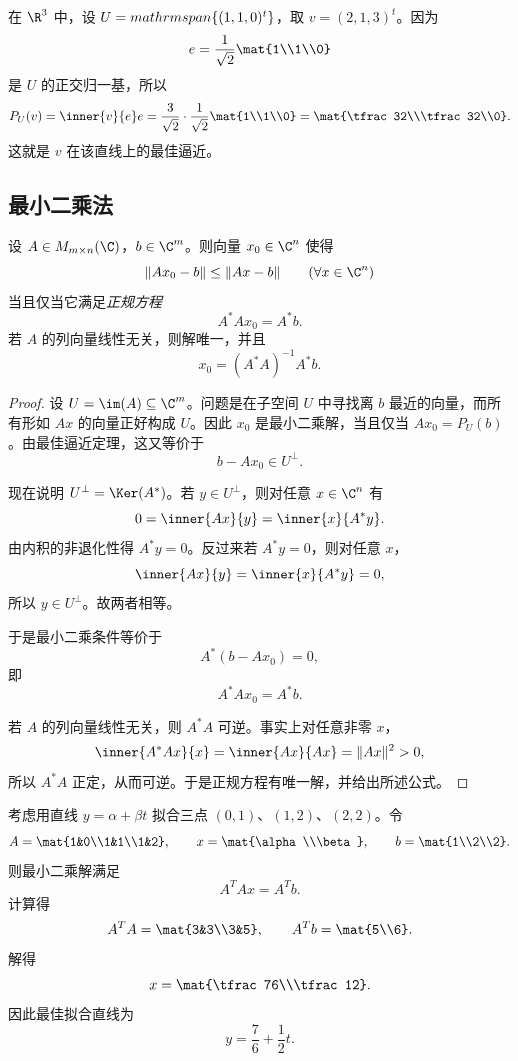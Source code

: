 \begin{example}
在 $\R^3$ 中，设 $U=\\mathrm{span}\{(1,1,0)^t\}$，取 $v=(2,1,3)^t$。因为
\[
e=\frac{1}{\sqrt2}\mat{1\\1\\0}
\]
是 $U$ 的正交归一基，所以
\[
P_U(v)=\inner{v}{e}e=\frac{3}{\sqrt2}\cdot \frac{1}{\sqrt2}\mat{1\\1\\0}=\mat{\tfrac32\\\tfrac32\\0}.
\]
这就是 $v$ 在该直线上的最佳逼近。
\end{example}

\subsection{最小二乘法}

\begin{theorem}[最小二乘与正规方程]
设 $A\in M_{m\times n}(\C)$，$b\in\C^m$。则向量 $x_0\in\C^n$ 使得
\[
\|Ax_0-b\|\le \|Ax-b\|\qquad (\forall x\in\C^n)
\]
当且仅当它满足\emph{正规方程}
\[
A^*Ax_0=A^*b.
\]
若 $A$ 的列向量线性无关，则解唯一，并且
\[
x_0=(A^*A)^{-1}A^*b.
\]
\end{theorem}

\begin{proof}
设 $U=\im(A)\subseteq \C^m$。问题是在子空间 $U$ 中寻找离 $b$ 最近的向量，而所有形如 $Ax$ 的向量正好构成 $U$。因此 $x_0$ 是最小二乘解，当且仅当 $Ax_0=P_U(b)$。由最佳逼近定理，这又等价于
\[
b-Ax_0\in U^{\perp}.
\]

现在说明 $U^{\perp}=\Ker(A^*)$。若 $y\in U^{\perp}$，则对任意 $x\in\C^n$ 有
\[
0=\inner{Ax}{y}=\inner{x}{A^*y}.
\]
由内积的非退化性得 $A^*y=0$。反过来若 $A^*y=0$，则对任意 $x$，
\[
\inner{Ax}{y}=\inner{x}{A^*y}=0,
\]
所以 $y\in U^{\perp}$。故两者相等。

于是最小二乘条件等价于
\[
A^*(b-Ax_0)=0,
\]
即
\[
A^*Ax_0=A^*b.
\]

若 $A$ 的列向量线性无关，则 $A^*A$ 可逆。事实上对任意非零 $x$，
\[
\inner{A^*Ax}{x}=\inner{Ax}{Ax}=\|Ax\|^2>0,
\]
所以 $A^*A$ 正定，从而可逆。于是正规方程有唯一解，并给出所述公式。
\end{proof}

\begin{example}
考虑用直线 $y=\alpha+\beta t$ 拟合三点 $(0,1)$、$(1,2)$、$(2,2)$。令
\[
A=\mat{1&0\\1&1\\1&2},\qquad x=\mat{\alpha\\\beta},\qquad b=\mat{1\\2\\2}.
\]
则最小二乘解满足
\[
A^TAx=A^Tb.
\]
计算得
\[
A^TA=\mat{3&3\\3&5},\qquad A^Tb=\mat{5\\6}.
\]
解得
\[
x=\mat{\tfrac76\\\tfrac12}.
\]
因此最佳拟合直线为
\[
y=\frac76+\frac12 t.
\]
\end{example}

